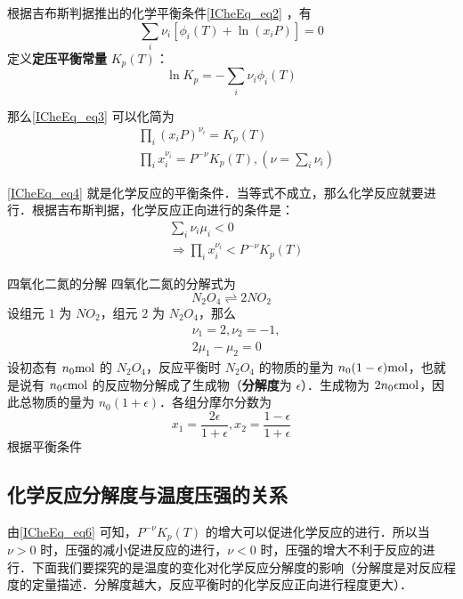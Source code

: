 根据吉布斯判据推出的化学平衡条件\autoref{ICheEq_eq2} ，有
\begin{equation}\label{ICheEq_eq3}
\sum_i\nu_i[\phi_i(T)+\ln (x_iP)]=0
\end{equation}
定义\textbf{定压平衡常量} $K_p(T)$：
\begin{equation}\label{ICheEq_eq5}
\ln K_p=-\sum_i\nu_i\phi_i(T)
\end{equation}

那么\autoref{ICheEq_eq3} 可以化简为
\begin{equation}\label{ICheEq_eq4}
\begin{aligned}
&\prod_i (x_iP)^{\nu_i}=K_p(T)\\
&\prod_i x_i^{\nu_i}=P^{-\nu} K_p(T),(\nu=\sum_i\nu_i)
\end{aligned}
\end{equation}

\autoref{ICheEq_eq4} 就是化学反应的平衡条件．当等式不成立，那么化学反应就要进行．根据吉布斯判据，化学反应正向进行的条件是：
\begin{equation}\label{ICheEq_eq6}
\begin{aligned}
&\sum_i \nu_i\mu_i<0\\
&\Rightarrow \prod_i x_i^{\nu_i}<P^{-\nu}K_p(T)
\end{aligned}
\end{equation}

\begin{example}{四氧化二氮的分解}
四氧化二氮的分解式为
\begin{equation}
N_2O_4\rightleftharpoons 2NO_2
\end{equation}
设组元 $1$ 为 $NO_2$，组元 $2$ 为 $N_2O_4$，那么
\begin{equation}
\begin{aligned}
&\nu_1=2,\nu_2=-1,\\
&2\mu_1-\mu_2=0
\end{aligned}
\end{equation}
设初态有 $n_0 \rm{mol}$ 的 $N_2O_4$，反应平衡时 $N_2O_4$ 的物质的量为 $n_0(1-\epsilon) \rm{mol}$，也就是说有 $n_0 \epsilon \rm{mol}$ 的反应物分解成了生成物（\textbf{分解度}为 $\epsilon$）．生成物为 $2n_0\epsilon \rm{mol}$，因此总物质的量为 $n_0(1+\epsilon)$．各组分摩尔分数为
\begin{equation}
x_1=\frac{2\epsilon}{1+\epsilon},x_2=\frac{1-\epsilon}{1+\epsilon}
\end{equation}
根据平衡条件 
\end{example}


\subsection{化学反应分解度与温度压强的关系}
由\autoref{ICheEq_eq6} 可知，$P^{-\nu}K_p(T)$ 的增大可以促进化学反应的进行．所以当 $\nu>0$ 时，压强的减小促进反应的进行，$\nu<0$ 时，压强的增大不利于反应的进行．下面我们要探究的是温度的变化对化学反应分解度的影响（分解度是对反应程度的定量描述．分解度越大，反应平衡时的化学反应正向进行程度更大）．

